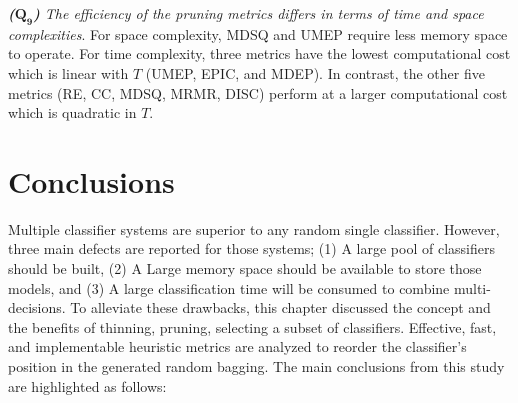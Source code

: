 \textit{\textbf{($\pmb{Q_9}$)} The efficiency of the pruning metrics differs in terms of time and space complexities}. For space complexity, MDSQ and UMEP require less memory space to operate. For time complexity, three metrics have the lowest computational cost which is linear with $T$ (UMEP, EPIC, and MDEP). In contrast, the other five metrics (RE, CC, MDSQ, MRMR, DISC) perform at a larger computational cost which is quadratic in $T$.




\section{Conclusions}\label{ch6_Conclusion}

Multiple classifier systems are superior to any random single classifier. However, three main defects are reported for those systems; (1) A large pool of classifiers should be built, (2) A Large memory space should be available to store those models, and (3) A large classification time will be consumed to combine multi-decisions. To alleviate these drawbacks, this chapter discussed the concept and the benefits of thinning, pruning, selecting a subset of classifiers. Effective, fast, and implementable heuristic metrics are analyzed to reorder the classifier's position in the generated random bagging. The main conclusions from this study are highlighted as follows:

